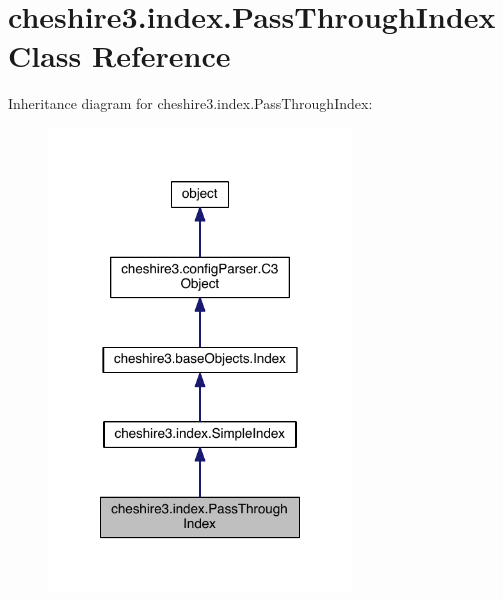 \hypertarget{classcheshire3_1_1index_1_1_pass_through_index}{\section{cheshire3.\-index.\-Pass\-Through\-Index Class Reference}
\label{classcheshire3_1_1index_1_1_pass_through_index}
}


Inheritance diagram for cheshire3.\-index.\-Pass\-Through\-Index\-:
\nopagebreak
\begin{figure}[H]
\begin{center}
\leavevmode
\includegraphics[width=228pt]{classcheshire3_1_1index_1_1_pass_through_index__inherit__graph}
\end{center}
\end{figure}



